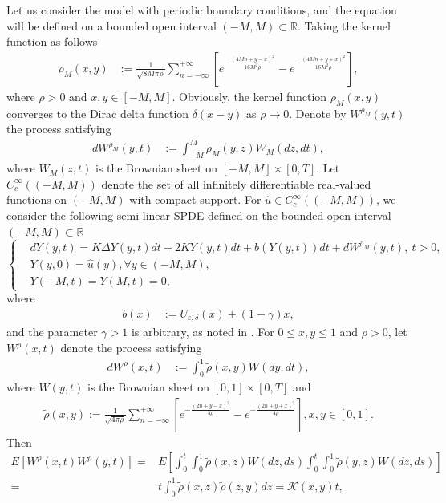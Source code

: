 \documentclass[11pt]{article}
\numberwithin{equation}{section}%
\numberwithin{figure}{section}%
\theoremstyle{remark}
\begin{document}
	Let us consider the model with periodic boundary conditions, and the equation will be defined on a bounded open interval $(-M,M)\subset\mathbb{R}$. Taking the kernel function as follows 
		\begin{align*}
		\rho_{M}(x,y)&:=\frac{1}{\sqrt{8M\pi\rho}}\sum_{n=-\infty}^{+\infty} \left[e^{-\frac{(4Mn+y-x)^{2}}{16M^{2}\rho}}-e^{-\frac{(4Mn+y+x)^{2}}{16M^{2}\rho}}\right], 		
	\end{align*}
	where $\rho>0$ and $x,y\in[-M,M]$. Obviously, the kernel function $\rho_{M}(x,y)$ converges to the Dirac delta function $\delta(x-y)$ as $\rho\rightarrow0$. Denote by $W^{\rho_{M}}(y,t)$ the process satisfying
\begin{align*}
	dW^{\rho_{M}}(y,t)&:=\int_{-M}^{M}\rho_{M}(y,z)W_{M}(dz,dt),
\end{align*}
where $W_{M}(z,t)$ is the Brownian sheet on $[-M,M]\times[0,T]$. Let $C_{c}^{\infty}((-M,M))$ denote the set of all infinitely differentiable real-valued functions on $(-M,M)$ with compact support. For $\hat{u}\in C_{c}^{\infty}((-M,M))$, we consider the following semi-linear SPDE defined on the bounded open interval $(-M,M)\subset\mathbb{R}$
	\begin{equation}\label{eq:2.3}
		\left\{
		\begin{aligned}
			&d Y(y,t)=K\Delta Y(y,t)dt+2K Y(y,t)dt+b(Y(y,t))dt+ dW^{\rho_{M}}(y,t),\ t> 0,\\
			&Y(y,0)=\hat{u}(y),\forall{y\in (-M,M)},\\
			&Y(-M,t)=Y(M,t)=0,
		\end{aligned}
		\right.
	\end{equation}
	where 
	\begin{align}\label{eq:drift}
		b(x)&:=U_{\varepsilon,\delta}(x)+(1-\gamma)x,		
	\end{align}
	and the parameter $\gamma>1$ is arbitrary, as noted in \cite{Cui2022document}.	For $0\leq x,y\leq 1$ and $\rho>0$, let $W^{\rho}(x,t)$ denote the process satisfying
	\begin{align*}
		dW^{\rho}(x,t)&:=\int_{0}^{1}\tilde{\rho}(x,y)W(dy,dt),
	\end{align*}
	where $W(y,t)$ is the Brownian sheet on $[0,1]\times[0,T]$ and
	\begin{align}\label{eq:2.5}
		\tilde{\rho}(x,y):=\frac{1}{\sqrt{4\pi\rho}}\sum_{n=-\infty}^{+\infty}\left[e^{-\frac{(2n+y-x)^{2}}{4\rho}}-e^{-\frac{(2n+y+x)^{2}}{4\rho}}\right], x,y\in[0,1].
	\end{align}
	Then
	\begin{align*}
		E[W^{\rho}(x,t)W^{\rho}(y,t)]=&E\left[\int_{0}^{t}\int_{0}^{1}\tilde{\rho}(x,z)W(dz,ds)\int_{0}^{t}\int_{0}^{1}\tilde{\rho}(y,z)W(dz,ds)\right]\\
		=&t\int_{0}^{1}\tilde{\rho}(x,z)\tilde{\rho}(z,y)dz=\mathcal{K}(x,y)t,
	\end{align*}
\end{document}
